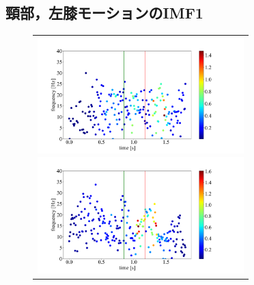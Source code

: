 \subsection{頸部，左膝モーションのIMF1}
\begin{figure}
    \begin{center}
        \begin{tabular}{c}
            \begin{minipage}{0.5\hsize}
                \begin{center}
                    \includegraphics[width=8cm]{./images/straight_data/neck/IMF1.png}
                \end{center}
            \end{minipage}

            \begin{minipage}{0.5\hsize}
                \begin{center}
                    \includegraphics[width=8cm]{./images/straight_data/left_leg/IMF1.png}
                \end{center}
            \end{minipage}
        \end{tabular}
    \end{center}
\end{figure}

